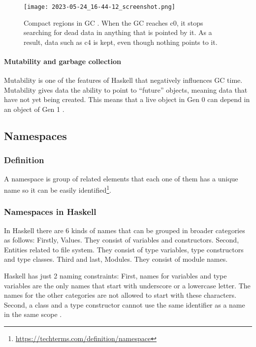 \documentclass[a4paper, titlepage, twoside]{article}
\begin{document}
\begin{figure}[htbp]
\centering
\texttt{[image: 2023-05-24\_16-44-12\_screenshot.png]}
\caption{\label{fig:org6b725fc}Compact regions in GC \autocite{channableLessonsManagingHaskell}. When the GC reaches c0, it stops searching for dead data in anything that is pointed by it. As a result, data such as c4 is kept, even though nothing points to it.}
\end{figure}

\paragraph*{Mutability and garbage collection}
\label{sec:orgc188af7}

Mutability is one of the features of Haskell that negatively influences GC time. Mutability gives data the ability to point to ``future'' objects, meaning data that have not yet being created. This means that a live object in Gen 0 can depend in an object of Gen 1 \autocite{channableLessonsManagingHaskell}.

\subsection{Namespaces}
\label{sec:org060db5f}

\subsubsection{Definition}
\label{sec:orgc710bf6}

A namespace is group of related elements that each one of them has a unique name so it can be easily identified\footnote{\url{https://techterms.com/definition/namespace}}.

\subsubsection{Namespaces in Haskell}
\label{sec:org5c11720}

In Haskell there are 6 kinds of names that can be grouped in broader categories as follows: Firstly, Values. They consist of variables and constructors. Second, Entities related to file system. They consist of type variables, type constructors and type classes. Third and last, Modules. They consist of module names.

Haskell has just 2 naming constraints: First, names for variables and type variables are the only names that start with underscore or a lowercase letter. The names for the other categories are not allowed to start with these characters. Second, a class and a type constructor cannot use the same identifier as a name in the same scope \autocite{marlowHaskell2010Language2010}.
\end{document}
